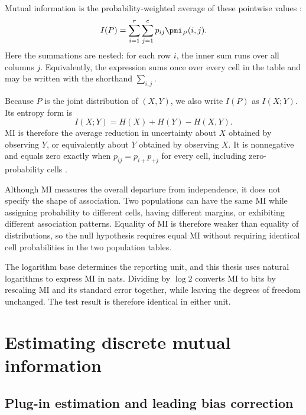 Mutual information is the probability-weighted average of these pointwise
values \citep{shannon1948,bossomaier2016}:
\begin{equation}
  I(P)
  =\sum_{i=1}^{r}\sum_{j=1}^{c}p_{ij}\pmi_P(i,j).
  \label{eq:background-mi}
\end{equation}
Here the summations are nested: for each row \(i\), the inner sum runs over
all columns \(j\). Equivalently, the expression sums once over every cell in
the table and may be written with the shorthand \(\sum_{i,j}\).

Because \(P\) is the joint distribution of \((X,Y)\), we also write
\(I(P)\) as \(I(X;Y)\). Its entropy form is
\begin{equation}
  I(X;Y)=H(X)+H(Y)-H(X,Y).
  \label{eq:mi-entropy-form}
\end{equation}
MI is therefore the average reduction in uncertainty about \(X\) obtained
by observing \(Y\), or equivalently about \(Y\) obtained by observing \(X\).
It is nonnegative and equals zero exactly when
\(p_{ij}=p_{i+}p_{+j}\) for every cell, including zero-probability cells
\citep{bossomaier2016}.

Although MI measures the overall departure from independence, it does not
specify the shape of association. Two populations can have the same MI while assigning
probability to different cells, having different margins, or exhibiting
different association patterns. Equality of MI is therefore weaker than equality of distributions, so
the null hypothesis requires equal MI without requiring identical cell
probabilities in the two population tables.

The logarithm base determines the reporting unit, and this thesis uses
natural logarithms to express MI in nats. Dividing by \(\log 2\)
converts MI to bits by rescaling MI and its standard error together,
while leaving the degrees of freedom unchanged. The test result is
therefore identical in either unit.

\section{Estimating discrete mutual information}
\label{sec:background-mi-bias}

\subsection{Plug-in estimation and leading bias correction}

